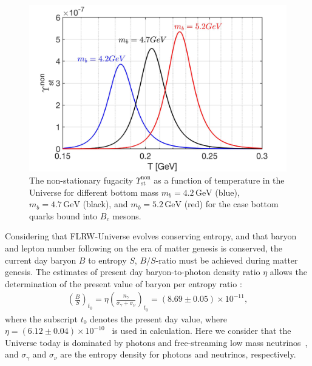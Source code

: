 \begin{figure}
\centerline{\includegraphics[width=0.9\linewidth]{./plots/NonstationaryFugacity}}
\caption{The non-stationary fugacity $\Upsilon_\mathrm{st}^{\mathrm{non}}$ as a function of temperature in the Universe for different bottom mass $m_b=4.2\,\mathrm{GeV}$ (blue), $m_b=4.7\,\mathrm{GeV}$ (black), and $m_b=5.2\,\mathrm{GeV}$ (red) for the case bottom quarks bound into $B_c$ mesons. }
\label{NonFugacity}
\end{figure}
 

 Considering that FLRW-Universe evolves conserving entropy, and that baryon and lepton number following on the era of matter genesis is conserved, the current day baryon $B$ to entropy $S$, $B/S$-ratio must be achieved during matter genesis. The estimates of present day baryon-to-photon density ratio $\eta$ allows the determination of the present value of baryon per entropy ratio \cite{Rafelski:2019twp,Letessier:2002ony,Fromerth:2002wb,Fromerth:2012fe}:
\begin{align}
\left(\frac{B}{S}\right)_{t_0}\!\!\!\!=\eta\left(\frac{n_\gamma}{\sigma_\gamma+\sigma_\nu}\right)_{\!t_0}\!\!\!\!=(8.69\pm0.05)\!\!\times\!\!10^{-11},
\end{align}
where the subscript $t_0$ denotes the present day value, where $\eta=(6.12\pm0.04)\times10^{-10}$~\cite{ParticleDataGroup:2018ovx} is used in calculation. Here we consider that the Universe today is dominated by photons and free-streaming low mass neutrinos~\cite{Birrell:2012gg}, and $\sigma_\gamma$ and $\sigma_\nu$ are the entropy density for photons and neutrinos, respectively. 
 
